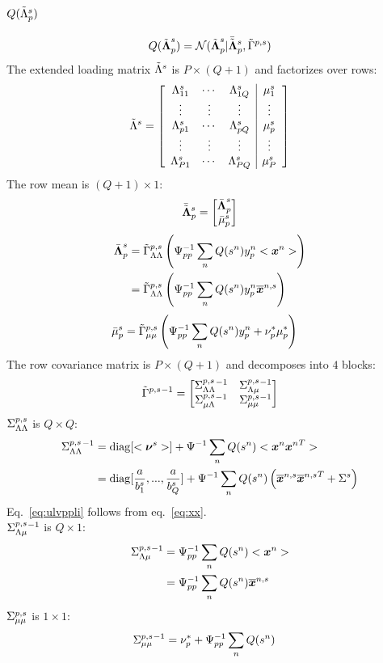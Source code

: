 \documentclass[a4paper]{article}
\begin{document}
\subsection{$Q(\tilde{\Lambda}^s_p)$}
\begin{align}
  Q(\tilde{\boldsymbol{\Lambda}}^s_p)=\mathcal{N}(\tilde{\boldsymbol{\Lambda}}^s_p|\bar{\tilde{\boldsymbol{\Lambda}}}^s_p,\tilde{\Gamma}^{p,s})
\end{align}
The extended loading matrix $\tilde{\Lambda}^s$ is $P\times (Q+1)$ and factorizes over rows:
\begin{align}
  \tilde{\Lambda}^s=\left[
    \begin{array}{ccc|c}
      \Lambda^s_{11} & \cdots & \Lambda^s_{1Q} & \mu^s_1 \\
      \vdots & \vdots & \vdots & \vdots \\
      \Lambda^s_{p1} & \cdots & \Lambda^s_{pQ} & \mu^s_p \\
      \vdots & \vdots & \vdots & \vdots \\
      \Lambda^s_{P1} & \cdots & \Lambda^s_{PQ} & \mu^s_P
    \end{array}
  \right]
\end{align}
The row mean is $(Q+1)\times 1$:
\begin{align}
  \bar{\tilde{\boldsymbol{\Lambda}}}^s_p=\begin{bmatrix}
    \bar{\boldsymbol{\Lambda}}^s_p \\
    \bar{\mu}^s_p
  \end{bmatrix}
\end{align}
\begin{align}
  \bar{\boldsymbol{\Lambda}}^s_p
  &=\tilde{\Gamma}^{p,s}_{\Lambda\Lambda}\left(\Psi^{-1}_{pp}\sum_n Q(s^n)y^n_p<\boldsymbol{x}^n>\right) \\
  &=\tilde{\Gamma}^{p,s}_{\Lambda\Lambda}\left(\Psi^{-1}_{pp}\sum_n Q(s^n)y^n_p\overline{\boldsymbol{x}}^{n,s}\right)
\end{align}
\begin{align}
  \bar{\mu}^s_p
  &=\tilde{\Gamma}^{p,s}_{\mu\mu}\left(\Psi^{-1}_{pp}\sum_n Q(s^n)y^n_p+\nu^*_p\mu^*_p\right)
\end{align}
The row covariance matrix is $P\times(Q+1)$ and decomposes into $4$ blocks:
\begin{align}
  \tilde{\Gamma}^{p,s}{}^{-1}=\begin{bmatrix}
    \Sigma^{p,s}_{\Lambda\Lambda}{}^{-1} & \Sigma^{p,s}_{\Lambda\mu}{}^{-1} \\
    \Sigma^{p,s}_{\mu\Lambda}{}^{-1} & \Sigma^{p,s}_{\mu\mu}{}^{-1}
  \end{bmatrix}
\end{align}
$\Sigma^{p,s}_{\Lambda\Lambda}$ is $Q\times Q$:
\begin{align}
  \Sigma^{p,s}_{\Lambda\Lambda}{}^{-1}
  &=\operatorname{diag}[<\boldsymbol{\nu}^s>]+\Psi^{-1}\sum_n Q(s^n)<\boldsymbol{x}^n{\boldsymbol{x}^n}^T> \\
  &=\operatorname{diag}[\frac{a}{b^s_1},...,\frac{a}{b^s_Q}]+\Psi^{-1}\sum_n Q(s^n)\left(\overline{\boldsymbol{x}}^{n,s}{\overline{\boldsymbol{x}}^{n,s}}^T+\Sigma^s\right) \label{eq:ulvppli}
\end{align}
Eq.~\ref{eq:ulvppli} follows from eq.~\ref{eq:xx}. \\
$\Sigma^{p,s}_{\Lambda\mu}{}^{-1}$ is $Q\times 1$:
\begin{align}
  \Sigma^{p,s}_{\Lambda\mu}{}^{-1}
  &=\Psi^{-1}_{pp}\sum_n Q(s^n)<\boldsymbol{x}^n> \\
  &=\Psi^{-1}_{pp}\sum_n Q(s^n)\overline{\boldsymbol{x}}^{n,s}
\end{align}
$\Sigma^{p,s}_{\mu\mu}$ is $1\times 1$:
\begin{align}
  \Sigma^{p,s}_{\mu\mu}{}^{-1}&=
  \nu^*_p+\Psi^{-1}_{pp}\sum_n Q(s^n)
\end{align}
\end{document}
